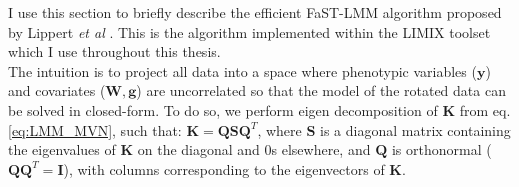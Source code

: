 



I use this section to  briefly describe the efficient FaST-LMM algorithm proposed by Lippert \textit{et al} \cite{lippert2011fast}.
This is the algorithm implemented within the LIMIX toolset \cite{lippert2014limix,casale2015efficient} which I use throughout this thesis.\\



The intuition is to project all data into a space where phenotypic variables ($\mathbf{y}$) and covariates ($\mathbf{W}, \mathbf{g}$) are uncorrelated so that the model of the rotated data can be solved in closed-form.
To do so, we perform eigen decomposition of $\mathbf{K}$ from eq. \eqref{eq:LMM_MVN}, such that: $\mathbf{K} = \mathbf{Q}\mathbf{S}\mathbf{Q}^T$, where $\mathbf{S}$ is a diagonal matrix containing the eigenvalues of $\mathbf{K}$ on the diagonal and 0s elsewhere, and $\mathbf{Q}$ is orthonormal ($\mathbf{Q}\mathbf{Q}^T = \mathbf{I}$), with columns corresponding to the eigenvectors of $\mathbf{K}$. \\

